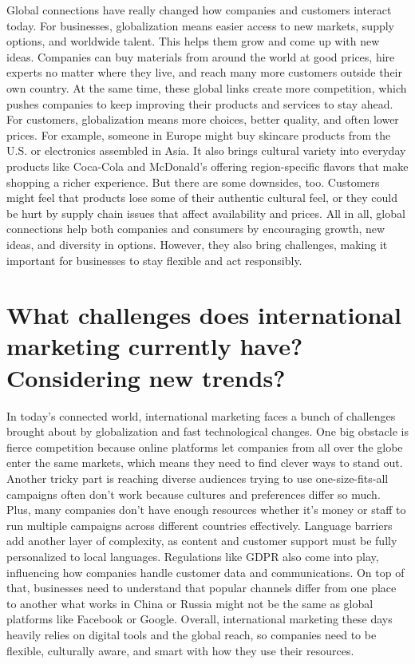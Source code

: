 \documentclass[letterpaper, 12pt]{report}
\begin{document}
Global connections have really changed how companies and customers interact today. For businesses, globalization means easier access to new markets, supply options, and worldwide talent. This helps them grow and come up with new ideas. Companies can buy materials from around the world at good prices, hire experts no matter where they live, and reach many more customers outside their own country. At the same time, these global links create more competition, which pushes companies to keep improving their products and services to stay ahead. For customers, globalization means more choices, better quality, and often lower prices. For example, someone in Europe might buy skincare products from the U.S. or electronics assembled in Asia. It also brings cultural variety into everyday products like Coca-Cola and McDonald's offering region-specific flavors that make shopping a richer experience. But there are some downsides, too. Customers might feel that products lose some of their authentic cultural feel, or they could be hurt by supply chain issues that affect availability and prices. All in all, global connections help both companies and consumers by encouraging growth, new ideas, and diversity in options. However, they also bring challenges, making it important for businesses to stay flexible and act responsibly.

\section{What challenges does international marketing currently have? Considering new trends?}

In today's connected world, international marketing faces a bunch of challenges brought about by globalization and fast technological changes. One big obstacle is fierce competition because online platforms let companies from all over the globe enter the same markets, which means they need to find clever ways to stand out. Another tricky part is reaching diverse audiences trying to use one-size-fits-all campaigns often don’t work because cultures and preferences differ so much. Plus, many companies don’t have enough resources whether it’s money or staff to run multiple campaigns across different countries effectively. Language barriers add another layer of complexity, as content and customer support must be fully personalized to local languages. Regulations like GDPR also come into play, influencing how companies handle customer data and communications. On top of that, businesses need to understand that popular channels differ from one place to another what works in China or Russia might not be the same as global platforms like Facebook or Google. Overall, international marketing these days heavily relies on digital tools and the global reach, so companies need to be flexible, culturally aware, and smart with how they use their resources.

\printbibliography
\end{document}
